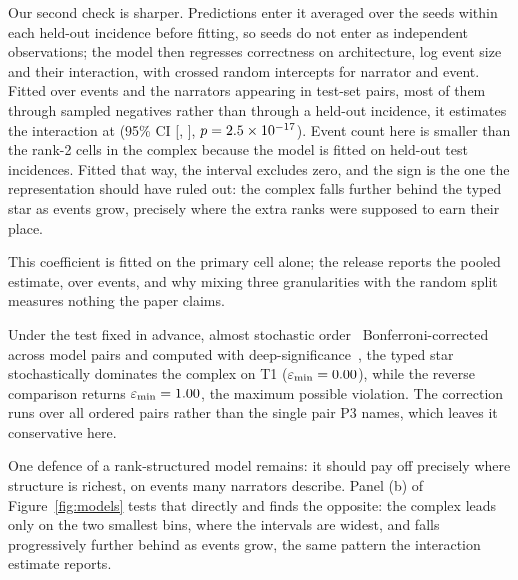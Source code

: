 \documentclass[conference]{IEEEtran}
\begin{document}
Our second check is sharper. Predictions enter it averaged over the \nSeeds{} seeds within
each
held-out incidence before fitting, so seeds do not enter as independent observations; the
model then regresses correctness on architecture, log event size and their interaction, with
crossed random intercepts for narrator and event.
Fitted over \interactionEvents{} events and the \interactionNarrators{} narrators appearing in
test-set pairs, most of them through sampled negatives rather than through a held-out
incidence, it estimates
the interaction at \interactionCoef{} (95\% CI [\interactionCiLo{}, \interactionCiHi{}],
$p = 2.5 \times 10^{-17}{}$). Event count here is smaller than the \nRankTwoCells{} rank-2 cells in
the complex because the model is fitted on held-out test incidences. Fitted that way, the
interval excludes
zero, and the sign is the one the representation should have ruled out: the complex falls
further behind the typed star as events grow, precisely where the extra ranks were supposed
to earn their place.

This coefficient is fitted on the primary cell alone; the release reports the pooled estimate,
\interactionCoefOld{} over \interactionEventsOld{} events, and why mixing three granularities
with the random split measures nothing the paper claims.

Under the test fixed in advance, almost stochastic order~\citep{dror2019deepdominance}
Bonferroni-corrected across \asoBonferroni{} model pairs and computed with
deep-significance~\citep{ulmer2022deepsig}, the typed star stochastically dominates the
complex on T1 ($\varepsilon_{\min} = 0.00{}$), while the reverse comparison
returns $\varepsilon_{\min} = 1.00{}$, the maximum possible violation. The
correction runs over all \asoBonferroni{} ordered pairs rather than the single pair P3 names,
which leaves it conservative here.

One defence of a rank-structured model remains: it should pay off precisely where structure
is richest, on events many narrators describe. Panel (b) of Figure~\ref{fig:models} tests
that directly and finds the opposite: the complex leads only on the two smallest bins, where
the intervals are widest, and falls progressively further behind as events grow, the same
pattern the interaction estimate reports.
\end{document}

